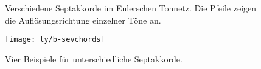 \begin{figure}
  \centering
  
  \caption{Verschiedene Septakkorde im Eulerschen Tonnetz. Die Pfeile zeigen die
    Auflösungsrichtung einzelner Töne an.}\label{fig:chordLinessevenths}
\end{figure}

\begin{figure}
	\centering
	\texttt{[image: ly/b-sevchords]}
	\caption{Vier Beispiele für unterschiedliche Septakkorde.}\label{fig:sevchords}
\end{figure}


